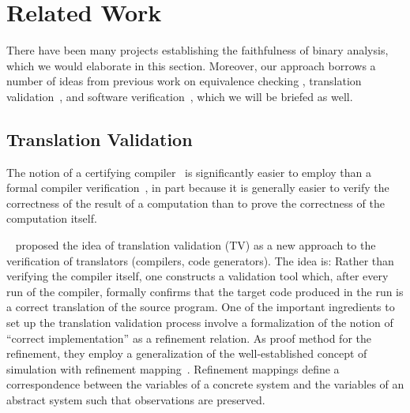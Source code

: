 \section{Related Work}\label{sec:related-work}
There have been many projects establishing the faithfulness of binary analysis, which we would elaborate in this section. Moreover, our approach borrows a number of ideas from previous work on equivalence checking \cite{}, translation validation~\cite{}, and software verification~\cite{},  which we will be briefed as well.

\subsection{Translation Validation}

The notion of a certifying compiler~\cite{Necula:2000,Pnueli:1998,Stepp:2011,Tristan:2011} is significantly easier to employ than a formal
compiler verification~\cite{Leroy:2009},
in part because it is generally easier
to verify the correctness of the result of a computation
than to prove the correctness of the computation itself. 

~\cite{Pnueli:1998} proposed the idea of translation validation (TV) as a new approach to the verification of translators (compilers, code generators). The idea is: Rather than verifying the compiler itself, one constructs a validation tool which, after every run of the compiler, formally confirms that the target code produced in the run is a correct translation of the source program. One of the important ingredients  to set up the  translation validation process involve a formalization of the notion of ``correct implementation'' as a refinement relation. As proof method for the refinement, they employ a generalization of the well-established concept of simulation with refinement mapping~\cite{Abadi:1991}. Refinement mappings define a correspondence between the variables of a concrete system and the variables of an abstract system such that observations are preserved. 

